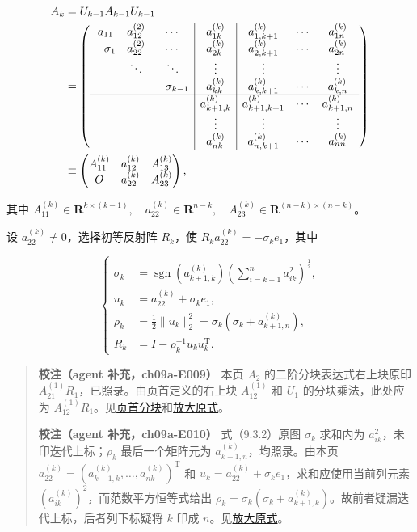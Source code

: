 \documentclass[
  10pt,
  fontset=fandol]{ctexart}
\begin{document}
\[
\begin{aligned}
A_k&=U_{k-1}A_{k-1}U_{k-1}\\
&=\left(\begin{array}{ccc|c|ccc}
a_{11}&a_{12}^{(2)}&\cdots&a_{1k}^{(k)}&a_{1,k+1}^{(k)}&\cdots&a_{1n}^{(k)}\\
-\sigma_1&a_{22}^{(2)}&\cdots&a_{2k}^{(k)}&a_{2,k+1}^{(k)}&\cdots&a_{2n}^{(k)}\\
&\ddots&\ddots&\vdots&\vdots&&\vdots\\
&&-\sigma_{k-1}&a_{kk}^{(k)}&a_{k,k+1}^{(k)}&\cdots&a_{k,n}^{(k)}\\\hline
&&&a_{k+1,k}^{(k)}&a_{k+1,k+1}^{(k)}&\cdots&a_{k+1,n}^{(k)}\\
&&&\vdots&\vdots&&\vdots\\
&&&a_{nk}^{(k)}&a_{n,k+1}^{(k)}&\cdots&a_{nn}^{(k)}
\end{array}\right)\\
&\equiv\begin{pmatrix}
A_{11}^{(k)}&a_{12}^{(k)}&A_{13}^{(k)}\\
O&a_{22}^{(k)}&A_{23}^{(k)}
\end{pmatrix},
\end{aligned}
\]

其中 \(A_{11}^{(k)}\in\mathbf R^{k\times(k-1)},\allowbreak \quad a_{22}^{(k)}\in\mathbf R^{n-k},\allowbreak \quad A_{23}^{(k)}\in\mathbf R^{(n-k)\times(n-k)}\)。

设 \(a_{22}^{(k)}\ne0\)，选择初等反射阵 \(R_k\)，使 \(R_ka_{22}^{(k)}=-\sigma_ke_1\)，其中

\[
\left\{
\begin{aligned}
\sigma_k&=\operatorname{sgn}(a_{k+1,k}^{(k)})\left(\sum_{i=k+1}^na_{ik}^2\right)^{\frac12},\\
u_k&=a_{22}^{(k)}+\sigma_ke_1,\\
\rho_k&=\frac12\|u_k\|_2^2=\sigma_k(\sigma_k+a_{k+1,n}^{(k)}),\\
R_k&=I-\rho_k^{-1}u_ku_k^{\mathrm T}.
\end{aligned}
\right.
\tag{9.3.2}
\]

\begin{quote}
\textbf{校注（agent 补充，ch09a-E009）} 本页 \(A_2\) 的二阶分块表达式右上块原印 \(A_{21}^{(1)}R_1\)，已照录。由页首定义的右上块 \(A_{12}^{(1)}\) 和 \(U_1\) 的分块乘法，此处应为 \(A_{12}^{(1)}R_1\)。见\href{../assets/ch09a/review-p246-initial-partition.png}{页首分块}和\href{../assets/ch09a/review-p246-A-2.png}{放大原式}。

\textbf{校注（agent 补充，ch09a-E010）} 式（9.3.2）原图 \(\sigma_k\) 求和内为 \(a_{ik}^2\)，未印迭代上标；\(\rho_k\) 最后一个矩阵元为 \(a_{k+1,n}^{(k)}\)，均照录。由本页 \(a_{22}^{(k)}=(a_{k+1,k}^{(k)},\ldots,a_{nk}^{(k)})^{\mathrm T}\) 和 \(u_k=a_{22}^{(k)}+\sigma_ke_1\)，求和应使用当前列元素 \((a_{ik}^{(k)})^2\)，而范数平方恒等式给出 \(\rho_k=\sigma_k(\sigma_k+a_{k+1,k}^{(k)})\)。故前者疑漏迭代上标，后者列下标疑将 \(k\) 印成 \(n\)。见\href{../assets/ch09a/review-p246-9-3-2.png}{放大原式}。
\end{quote}
\end{document}

